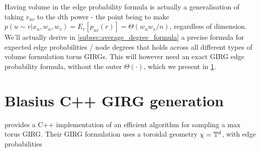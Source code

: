 Having volume in the edge probability formula is actually a generalisation of taking $r_{uv}$ to the dth power - the point being to make $p(u \sim v | x_u, w_u, w_v) = E_r[p_{uv}(r)] = \Theta(w_u w_v/n)$, regardless of dimension. We'll actually derive in \cref{subsec:average_degree_formula} a precise formula for expected edge probabilities / node degrees that holds across all different types of volume formulation torus GIRGs. This will however need an exact GIRG edge probability formula, without the outer $\Theta ( \cdot )$, which we present in \cref{sec:blasius_cpp_generation}.





\section{Blasius C++ GIRG generation}
\label{sec:blasius_cpp_generation}
\cite{blasius2022efficiently} provides a C++ implementation of an efficient algorithm for sampling a max torus GIRG.
Their GIRG formulation uses a toroidal geometry $\chi = \mathbb{T}^d$, with edge probabilities 

